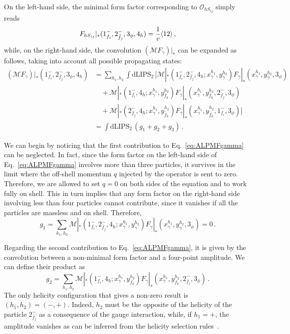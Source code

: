 On the left-hand side, the minimal form factor corresponding to $\mathcal O_{hS_{ij}}$ simply
reads
\begin{equation}
    F_{hS_{ij}}|_*(1_{f_i}^-,2_{\bar f_j}^-,3_\phi,4_h) = \frac{1}{v}\langle 1 2 \rangle\,,
\end{equation}
while, on the right-hand side, the convolution $(\mathcal M F_\gamma)|_*$ can be expanded as
follows, taking into account all possible propagating states:
\begin{align}\label{eq:ALPMFgamma}
    (\mathcal M F_\gamma)|_*(1_{f_i}^-,2_{\bar f_j}^-,3_\phi,4_h) &= \sum_{h_1,h_2}\int \text{dLIPS}_2\,\bigg[
    \mathcal M|_*(1_{f_i}^-,2_{\bar f_j}^-,4_h;x_\gamma^{h_1},y_\gamma^{h_2}) F_\gamma|_*(x_\gamma^{h_1},y_\gamma^{h_2},3_\phi)\nonumber \\
    &\quad+\mathcal M|_*(1_{ f_i}^-,4_h;x_\gamma^{h_1},y_{ f_k}^{h_2}) F_\gamma|_*(x_\gamma^{h_1},y_{ f_k}^{h_2},2_{\bar f_j}^-,3_\phi)\nonumber\\
    &\quad+\mathcal M|_*(2_{\bar f_j}^-,4_h;x_\gamma^{h_1},y_{\bar f_k}^{h_2}) F_\gamma|_*(x_\gamma^{h_1},y_{\bar f_k}^{h_2},1_{f_i}^-,3_\phi)
    \bigg]\nonumber \\
    &= \int \text{dLIPS}_2\,(g_1+g_2+g_3) \,.
\end{align}

We can begin by noticing that the first contribution to Eq.~\eqref{eq:ALPMFgamma} can be
neglected.
In fact, since the form factor on the left-hand side of Eq.~\eqref{eq:ALPMFgamma} involves more
than three particles, it survives in the limit where the off-shell momentum $q$ injected by the
operator is sent to zero.
Therefore, we are allowed to set $q=0$ on both sides of the equation and to work fully
on shell.
This in turn implies that any form factor on the right-hand side involving less than four
particles cannot contribute, since it vanishes if all the particles are massless and on shell.
Therefore,
\begin{equation}
    g_1=\sum_{h_1,h_2}\mathcal M|_*(1_{f_i}^-,2_{\bar f_j}^-,4_h;x_\gamma^{h_1},y_\gamma^{h_2}) F_\gamma|_*(x_\gamma^{h_1},y_\gamma^{h_2},3_\phi)=0\,.
\end{equation}

Regarding the second contribution to Eq.~\eqref{eq:ALPMFgamma}, it is given by the convolution
between a non-minimal form factor and a four-point amplitude.
We can define their product as
\begin{equation}
    g_2=\sum_{h_1,h_2} \mathcal M|_*(1_{ f_i}^-,4_h;x_\gamma^{h_1},y_{ f_k}^{h_2}) F_\gamma|_*(x_\gamma^{h_1},y_{ f_k}^{h_2},2_{\bar f_j}^-,3_\phi)\,.
\end{equation}
The only helicity configuration that gives a non-zero result is $(h_1,h_2)=(-,+)$.
Indeed, $h_2$ must be the opposite of the helicity of the particle $2^-_{\bar f_j}$ as a
consequence of the gauge interaction, while, if $h_1=+$, the amplitude vanishes as can be
inferred from the helicity selection
rules~\cite{Grisaru:1977px,Grisaru:1976vm,Mangano:1990by,Cheung:2015aba,Parke:1985pn,Azatov:2016sqh}.

